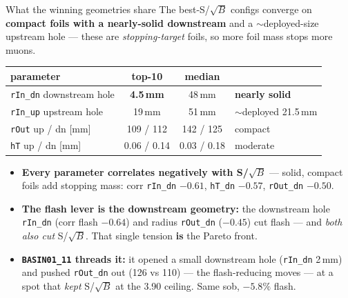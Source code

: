 \documentclass[aspectratio=169,10pt]{beamer}
\begin{document}
\begin{frame}{What the winning geometries share}
\small
The best-S/$\sqrt{B}$ configs converge on \textbf{compact foils with a nearly-solid downstream}
and a $\sim$deployed-size upstream hole --- these are \emph{stopping-target} foils, so more foil
mass stops more muons.
\vspace{0.3em}
\begin{center}
\begin{tabular}{@{}l c c l@{}}
\toprule
parameter & top-10 & median & \\
\midrule
\texttt{rIn\_dn} downstream hole & \textbf{4.5\,mm} & 48\,mm & \textbf{nearly solid} \\
\texttt{rIn\_up} upstream hole   & 19\,mm & 51\,mm & $\sim$deployed 21.5\,mm \\
\texttt{rOut} up / dn [mm]       & 109 / 112 & 142 / 125 & compact \\
\texttt{hT} up / dn [mm]         & 0.06 / 0.14 & 0.03 / 0.18 & moderate \\
\bottomrule
\end{tabular}
\end{center}
\vspace{0.2em}
\begin{itemize}\footnotesize
  \item \textbf{Every parameter correlates negatively with S/$\sqrt{B}$} --- solid, compact foils
        add stopping mass: corr \texttt{rIn\_dn} $-0.61$, \texttt{hT\_dn} $-0.57$, \texttt{rOut\_dn} $-0.50$.
  \item \textbf{The flash lever is the downstream geometry:} the downstream hole \texttt{rIn\_dn}
        (corr flash $-0.64$) and radius \texttt{rOut\_dn} ($-0.45$) cut flash --- and \emph{both also
        cut} S/$\sqrt{B}$. That single tension \textbf{is} the Pareto front.
  \item \textbf{\texttt{BASIN01\_11} threads it:} it opened a small downstream hole
        (\texttt{rIn\_dn} 2\,mm) and pushed \texttt{rOut\_dn} out (126 vs 110) --- the flash-reducing
        moves --- at a spot that \emph{kept} S/$\sqrt{B}$ at the 3.90 ceiling. Same sob, $-5.8\%$ flash.
\end{itemize}
\end{frame}
\end{document}
